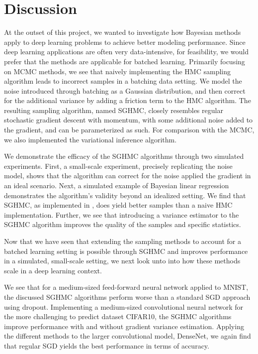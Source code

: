 \chapter{Discussion}

At the outset of this project, we wanted to investigate how  Bayesian methods apply to deep learning problems to achieve better modeling performance.
Since deep learning applications are often very data-intensive, for feasibility, we would prefer that the methods are applicable for batched learning. 
Primarily focusing on MCMC methods, we see that naively implementing the HMC sampling algorithm leads to incorrect samples in a batching data setting.
We model the noise introduced through batching as a Gaussian distribution, and then correct for the additional variance by adding a friction term to the HMC algorithm. 
The resulting sampling algorithm, named SGHMC, closely resembles regular stochastic gradient descent with momentum, with some additional noise added to the gradient, and can be parameterized as such.
For comparison with the MCMC, we also implemented the variational inference algorithm.

We demonstrate the efficacy of the SGHMC algorithms through two simulated experiments. 
First, a small-scale experiment, precisely replicating the noise model, shows that the algorithm can correct for the noise applied the gradient in an ideal scenario. 
Next, a simulated example of Bayesian linear regression demonstrates the algorithm's validity beyond an idealized setting.  
We find that SGHMC, as implemented in \cite{chen_stochastic_2014}, does yield better samples than a naive HMC implementation. 
Further, we see that introducing a variance estimator to the SGHMC algorithm improves the quality of the samples and specific statistics. 

Now that we have seen that extending the sampling methods to account for a batched learning setting is possible through SGHMC and improves performance in a simulated, small-scale setting, we next look unto into how these methods scale in a deep learning context.

We see that for a medium-sized feed-forward neural network applied to MNIST, the discussed SGHMC algorithms perform worse than a standard SGD approach using dropout. 
Implementing a medium-sized convolutional neural network for the more challenging to predict dataset CIFAR10, the SGHMC algorithms improve performance with and without gradient variance estimation. 
Applying the different methods to the larger convolutional model, DenseNet, we again find that regular SGD yields the best performance in terms of accuracy. 

